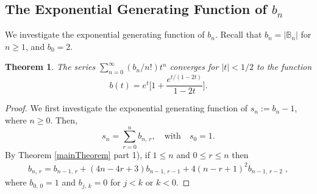\documentclass[11pt]{article}
\newtheorem{theorem}{Theorem}[section]
\newcommand{\q}{\quad}
\newcommand{\ges}{\geqslant}
\newcommand{\les}{\leqslant}
\begin{document}
\subsection{The Exponential Generating Function of $b_n$}
We investigate the exponential generating function of $b_n$. Recall that $b_n=|\mathbb B_n|$ for $n\ges 1$, and $b_{0}=2$.
\begin{theorem}{\label{generatingBn}}
The series $\sum_{n=0}^{\infty}(b_n/n!)t^n$ converges for $|t|<1/2$ to the function 
\[b(t)=e^t\Big[1 + \frac{e^{t/(1-2t)}}{1-2t}\Big].\]
\end{theorem}
\begin{proof} 
We first investigate the exponential generating function of $s_n:=b_n-1$, where $n\ge 0$. Then, 
\[
    s_n = \sum_{r=0}^{n} b_{n,\, r},\q\text{with}\q s_0 = 1.
\]
By Theorem \ref{mainTheorem} part 1), if $1\les n$ and $0\les r\les n$ then 
\begin{align*}
b_{n,\,r}=b_{n-1,\,r}+(4n-4r+3)b_{n-1,\,r-1}+4(n-r+1)^2b_{n-1,\,r-2}\;,
\end{align*}
where $b_{0,\,0}=1$ and $b_{j,\,k}=0$ for $j<k$ or $k<0$.


\end{proof}
\end{document}
